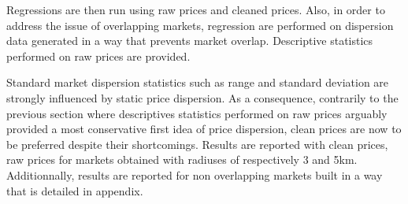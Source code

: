 \documentclass[11pt]{article}
\begin{document}
Regressions are then run using raw prices and cleaned prices. Also, in order to address the issue of overlapping markets, regression are performed on dispersion data generated in a way that prevents market overlap. Descriptive statistics performed on raw prices are provided.

Standard market dispersion statistics such as range and standard deviation are strongly influenced by static price dispersion. As a consequence, contrarily to the previous section where descriptives statistics performed on raw prices arguably provided a most conservative first idea of price dispersion, clean prices are now to be preferred despite their shortcomings. Results are reported with clean prices, raw prices for markets obtained with radiuses of respectively 3 and 5km. Additionnally, results are reported for non overlapping markets built in a way that is detailed in appendix.
\end{document}
